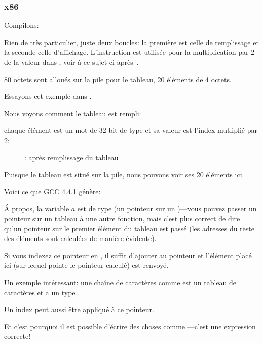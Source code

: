 \subsubsection{x86}


Compilons:




Rien de très particulier, juste deux boucles: la première est celle de remplissage
et la seconde celle d'affichage.
L'instruction  est utilisée pour la multiplication par 2 de la valeur
dans \ECX, voir à ce sujet ci-après~.

80 octets sont alloués sur la pile pour le tableau, 20 éléments de 4 octets.

\clearpage
Essayons cet exemple dans \olly.
\myindex{\olly}

Nous voyons comment le tableau est rempli:

chaque élément est un mot de 32-bit de type \Tint et sa valeur est l'index mutliplié
par 2:

\begin{figure}[H]
\centering
{}
\caption{\olly: après remplissage du tableau}
\label{fig:array_simple_olly}
\end{figure}

Puisque le tableau est situé sur la pile, nous pouvons voir ses 20 éléments ici.


Voici ce que GCC 4.4.1 génère:



Á propos, la variable $a$ est de type  (un pointeur sur un \Tint{})---vous
pouvez passer un pointeur sur un tableau à une autre fonction, mais c'est plus correct
de dire qu'un pointeur sur le premier élément du tableau est passé (les adresses
du reste des éléments sont calculées de manière évidente).

Si vous indexez ce pointeur en , il suffit d'ajouter  au pointeur
et l'élément placé ici (sur lequel pointe le pointeur calculé) est renvoyé.

Un exemple intéressant: une chaîne de caractères comme  est un tableau
de caractères et a un type .

Un index peut aussi être appliqué à ce pointeur.

Et c'est pourquoi il est possible d'écrire des choses comme ---c'est
une expression \CCpp correcte!

